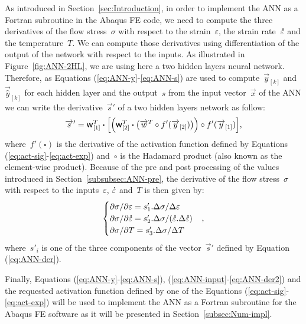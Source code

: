 \documentclass[algorithms,article,submit,pdftex,oneauthors]{Definitions/mdpi}
\DeclareRobustCommand{\w}{\mbox{\large\ensuremath{\mathsf{w}}}}
\DeclareRobustCommand{\dotp}{\boldsymbol{\cdot}}
\DeclareRobustCommand{\lay}[1]{_{[#1]}}
\DeclareRobustCommand{\mdot}[1]{\accentset{\mbox{\bfseries .}}{#1}}
\begin{document}
As introduced in Section~\ref{sec:Introduction}, in order to implement the ANN as a Fortran subroutine in the Abaqus FE code, we need to compute the three derivatives of the flow stress~$\sigma$ with respect to the strain~$\varepsilon$, the strain rate~$\mdot{\varepsilon}$ and the temperature~$T$.
We can compute those derivatives using differentiation of the output of the network with respect to the inputs.
As illustrated in Figure~\ref{fig:ANN-2HL}, we are using here a two hidden layers neural network.
Therefore, as Equations (\ref{eq:ANN-y}-\ref{eq:ANN-s}) are used to compute~$\overrightarrow{y}\lay{k}$ and~$\overrightarrow{\hat{y}}\lay{k}$ for each hidden layer and the output~$s$ from the input vector~$\overrightarrow{x}$ of the ANN we can write the derivative~$\overrightarrow{s}'$ of a two hidden layers network as follow:
\begin{equation}
\overrightarrow{s}' = \w\lay{1}^T \dotp\left[\left(\w\lay{2}^T \dotp \left(\overrightarrow{w}^T \circ f'(\overrightarrow{y}\lay{2})\right)\right) \circ f'(\overrightarrow{y}\lay{1})\right] \label{eq:ANN-der},
\end{equation}
where~$f'\left(\square\right)$ is the derivative of the activation function defined by Equations (\ref{eq:act-sig}-\ref{eq:act-exp}) and~$\circ$ is the Hadamard product (also known as the element-wise product).
Because of the pre and post processing of the values introduced in Section~\ref{subsubsec:ANN-pre}, the derivative of the flow stress~$\sigma$ with respect to the inputs~$\varepsilon$, $\mdot{\varepsilon}$ and~$T$ is then given by:
\begin{equation}
\begin{cases}
\partial \sigma/\partial \varepsilon = s'_{1}.\Delta\sigma / \Delta\varepsilon\\
\partial \sigma/\partial\mdot{\varepsilon} = s'_{2}.\Delta\sigma / (\mdot{\varepsilon}.\Delta\mdot{\varepsilon})\\
\partial \sigma/\partial T = s'_{3}.\Delta\sigma / \Delta T
\end{cases}
\label{eq:ANN-der2},
\end{equation}
where~$s'_i$ is one of the three components of the vector~$\overrightarrow{s}'$ defined by Equation (\ref{eq:ANN-der}).

Finally, Equations (\ref{eq:ANN-y}-\ref{eq:ANN-s}), (\ref{eq:ANN-input}-\ref{eq:ANN-der2}) and the requested activation function defined by one of the Equations (\ref{eq:act-sig}-\ref{eq:act-exp}) will be used to implement the ANN as a Fortran subroutine for the Abaqus FE software as it will be presented in Section~\ref{subsec:Num-impl}.
\end{document}

